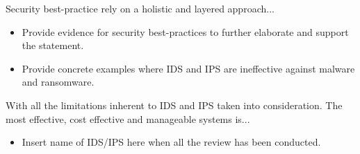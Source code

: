 Security best-practice rely on a holistic and layered approach...

\begin{followup}[to-do]
    \begin{itemize}
        \item Provide evidence for security best-practices to further elaborate and support the statement.
        \item Provide concrete examples where IDS and IPS are ineffective against malware and ransomware.
    \end{itemize}
\end{followup}

With all the limitations inherent to IDS and IPS taken into consideration. The most effective, cost effective and manageable systems is...

\begin{followup}[to-do]
    \begin{itemize}
        \item Insert name of IDS/IPS here when all the review has been conducted.
    \end{itemize}
\end{followup}